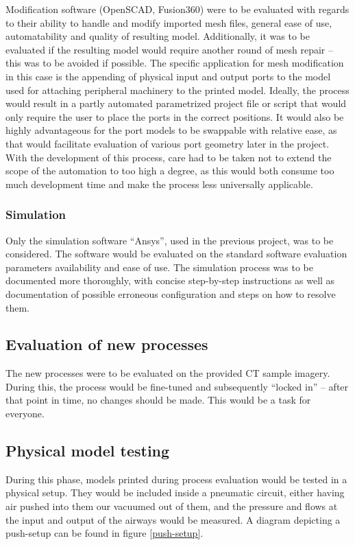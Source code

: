 \documentclass[MME,Projekt,english]{twbook}%
\begin{document}
Modification software (OpenSCAD, Fusion360) were to be evaluated with regards to their ability to handle and modify imported mesh files, general ease of use, automatability and quality of resulting model. Additionally, it was to be evaluated if the resulting model would require another round of mesh repair – this was to be avoided if possible. The specific application for mesh modification in this case is the appending of physical input and output ports to the model used for attaching peripheral machinery to the printed model. Ideally, the process would result in a partly automated parametrized project file or script that would only require the user to place the ports in the correct positions. It would also be highly advantageous for the port models to be swappable with relative ease, as that would facilitate evaluation of various port geometry later in the project. With the development of this process, care had to be taken not to extend the scope of the automation to too high a degree, as this would both consume too much development time and make the process less universally applicable.

\subsubsection{Simulation}

Only the simulation software “Ansys”, used in the previous project, was to be considered. The software would be evaluated on the standard software evaluation parameters availability and ease of use. The simulation process was to be documented more thoroughly, with concise step-by-step instructions as well as documentation of possible erroneous configuration and steps on how to resolve them.

\subsection{Evaluation of new processes}

The new processes were to be evaluated on the provided CT sample imagery. During this, the process would be fine-tuned and subsequently “locked in” – after that point in time, no changes should be made. This would be a task for everyone.

\newpage
\subsection{Physical model testing}

During this phase, models printed during process evaluation would be tested in a physical setup. They would be included inside a pneumatic circuit, either having air pushed into them our vacuumed out of them, and the pressure and flows at the input and output of the airways would be measured. A diagram depicting a push-setup can be found in figure \ref{push-setup}.
\end{document}
